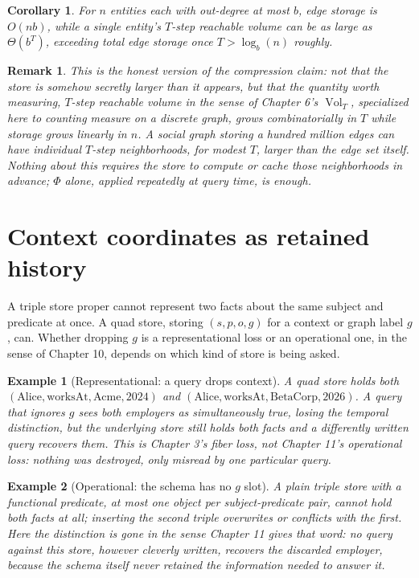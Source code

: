 \documentclass[11pt]{report}
\newtheorem{remark}{Remark}[chapter]
\newtheorem{corollary}{Corollary}[chapter]
\newtheorem{example}{Example}[chapter]
\begin{document}
\begin{corollary}
For $n$ entities each with out-degree at most $b$, edge storage is
$O(nb)$, while a single entity's $T$-step reachable volume can be as
large as $\Theta(b^T)$, exceeding total edge storage once
$T > \log_b(n)$ roughly.
\end{corollary}

\begin{remark}
This is the honest version of the compression claim: not that the
store is somehow secretly larger than it appears, but that the
quantity worth measuring, $T$-step reachable volume in the sense of
Chapter 6's $\operatorname{Vol}_T$, specialized here to counting
measure on a discrete graph, grows combinatorially in $T$ while
storage grows linearly in $n$. A social graph storing a hundred
million edges can have individual $T$-step neighborhoods, for modest
$T$, larger than the edge set itself. Nothing about this requires the
store to compute or cache those neighborhoods in advance; $\Phi$
alone, applied repeatedly at query time, is enough.
\end{remark}

\section*{Context coordinates as retained history}

A triple store proper cannot represent two facts about the same
subject and predicate at once. A quad store, storing $(s,p,o,g)$ for
a context or graph label $g$, can. Whether dropping $g$ is a
representational loss or an operational one, in the sense of Chapter
10, depends on which kind of store is being asked.

\begin{example}[Representational: a query drops context]
A quad store holds both $(\text{Alice}, \text{worksAt}, \text{Acme},
2024)$ and $(\text{Alice}, \text{worksAt}, \text{BetaCorp}, 2026)$. A
query that ignores $g$ sees both employers as simultaneously true,
losing the temporal distinction, but the underlying store still holds
both facts and a differently written query recovers them. This is
Chapter 3's fiber loss, not Chapter 11's operational loss: nothing was
destroyed, only misread by one particular query.
\end{example}

\begin{example}[Operational: the schema has no $g$ slot]
A plain triple store with a functional predicate, at most one object
per subject-predicate pair, cannot hold both facts at all; inserting
the second triple overwrites or conflicts with the first. Here the
distinction is gone in the sense Chapter 11 gives that word: no query
against this store, however cleverly written, recovers the discarded
employer, because the schema itself never retained the information
needed to answer it.
\end{example}
\end{document}
